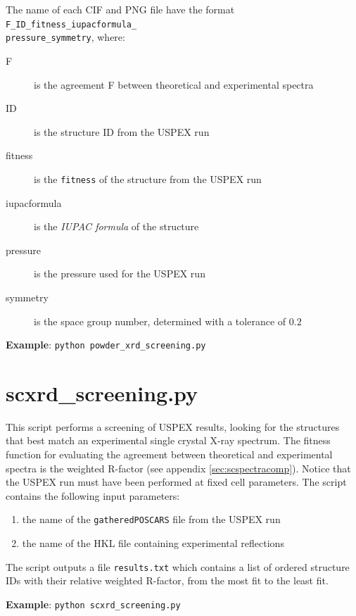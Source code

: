 \documentclass{article}
\begin{document}
The name of each CIF and PNG file have the format \texttt{F\_ID\_fitness\_iupacformula\_ \\ pressure\_symmetry}, where:
\begin{description}
	\item[F] is the agreement F between theoretical and experimental spectra
	\item[ID] is the structure ID from the USPEX run
	\item[fitness] is the \texttt{fitness} of the structure from the USPEX run
	\item[iupacformula] is the \emph{IUPAC formula} of the structure
	\item[pressure] is the pressure used for the USPEX run
	\item[symmetry] is the space group number, determined with a tolerance of $0.2$
\end{description}
\textbf{Example}: \texttt{python powder\_xrd\_screening.py}

\section{scxrd\_screening.py}
This script performs a screening of USPEX results, looking for the structures that best match an experimental single crystal X-ray spectrum. The fitness function for evaluating the agreement between theoretical and experimental spectra is the weighted R-factor (see appendix \ref{sec:scspectracomp}). Notice that the USPEX run must have been performed at fixed cell parameters. The script contains the following input parameters:
\begin{enumerate}
	\item the name of the \texttt{gatheredPOSCARS} file from the USPEX run
	\item the name of the HKL file containing experimental reflections
\end{enumerate}
The script outputs a file \texttt{results.txt} which contains a list of ordered structure IDs with their relative weighted R-factor, from the most fit to the least fit.

\noindent \textbf{Example}: \texttt{python scxrd\_screening.py}
\end{document}
